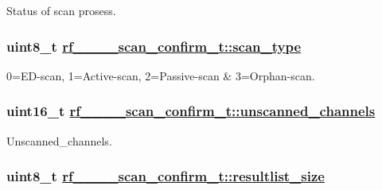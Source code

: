 Status of scan prosess. \hypertarget{structrf__802__15__4__scan__confirm__t_4b7a9839e5e9d6f309257bb0a1f36a5b}{
\subsubsection[scan\_\-type]{\setlength{\rightskip}{0pt plus 5cm}uint8\_\-t \hyperlink{structrf__802__15__4__scan__confirm__t_4b7a9839e5e9d6f309257bb0a1f36a5b}{rf\_\_\_\_\-scan\_\-confirm\_\-t::scan\_\-type}}}
\label{structrf__802__15__4__scan__confirm__t_4b7a9839e5e9d6f309257bb0a1f36a5b}


0=ED-scan, 1=Active-scan, 2=Passive-scan \& 3=Orphan-scan. \hypertarget{structrf__802__15__4__scan__confirm__t_72106d46e0d0caf8217fad75c5a15bfc}{
\subsubsection[unscanned\_\-channels]{\setlength{\rightskip}{0pt plus 5cm}uint16\_\-t \hyperlink{structrf__802__15__4__scan__confirm__t_72106d46e0d0caf8217fad75c5a15bfc}{rf\_\_\_\_\-scan\_\-confirm\_\-t::unscanned\_\-channels}}}
\label{structrf__802__15__4__scan__confirm__t_72106d46e0d0caf8217fad75c5a15bfc}


Unscanned\_\-channels. \hypertarget{structrf__802__15__4__scan__confirm__t_69e1e9a757f57301370d4e4229aa60da}{
\subsubsection[resultlist\_\-size]{\setlength{\rightskip}{0pt plus 5cm}uint8\_\-t \hyperlink{structrf__802__15__4__scan__confirm__t_69e1e9a757f57301370d4e4229aa60da}{rf\_\_\_\_\-scan\_\-confirm\_\-t::resultlist\_\-size}}}
\label{structrf__802__15__4__scan__confirm__t_69e1e9a757f57301370d4e4229aa60da}


